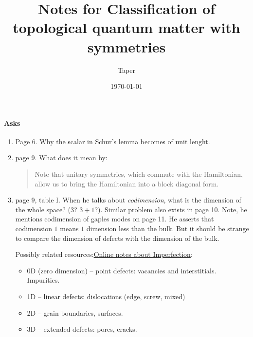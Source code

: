 \documentclass{article}
\title{Notes for Classification of topological quantum matter with
symmetries}
\date{\today}
\author{Taper}
\begin{document}
\maketitle
{}
\tableofcontents
\paragraph{Asks}
\begin{enumerate}
    \item Page 6. Why the scalar in Schur's lemma becomes of unit lenght.
    \item page 9. What does it mean by:
        \begin{quote}
            Note that unitary symmetries, which commute with the
            Hamiltonian, allow us to bring the Hamiltonian into a
            block diagonal form.
        \end{quote}
    \item page 9, table I. When he talks about \textit{codimension},
        what is the dimension of the whole space? ($3$? $3+1$?).
        Similar problem also exists in page 10.
        Note, he mentions codimension of gaples modes on page 11. He
        asserts that codimension $1$ means $1$ dimension less than the
        bulk. But it should be strange to compare the dimension of
        defects with the dimension of the bulk.

        Possibly related
        resources:\href{http://www.virginia.edu/bohr/mse209/chapter4.htm}
        {Online notes about Imperfection}:
        \begin{itemize}
            \item $0$D (zero dimension) – point defects: vacancies and
                interstitials. Impurities.
            \item 1D – linear defects: dislocations (edge, screw,
                mixed) 
            \item 2D – grain boundaries, surfaces.  
            \item 3D – extended defects: pores, cracks.
        \end{itemize}


\end{enumerate}
\end{document}
